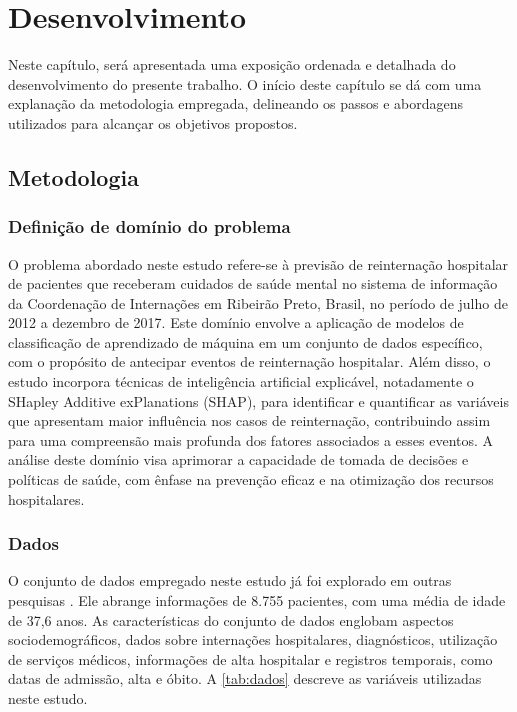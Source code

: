 

\chapter{Desenvolvimento}\label{cap-desenv}

Neste capítulo, será apresentada uma exposição ordenada e detalhada do desenvolvimento do presente trabalho. O início deste capítulo se dá com uma explanação da metodologia empregada, delineando os passos e abordagens utilizados para alcançar os objetivos propostos.

\section{Metodologia}\label{sec-metodologia}

\subsection{Definiç\~ao de domínio do problema}

O problema abordado neste estudo refere-se à previsão de reinternação hospitalar de pacientes que receberam cuidados de saúde mental no sistema de informação da Coordenação de Internações em Ribeirão Preto, Brasil, no período de julho de 2012 a dezembro de 2017. Este domínio envolve a aplicação de modelos de classificação de aprendizado de máquina em um conjunto de dados específico, com o propósito de antecipar eventos de reinternação hospitalar. Além disso, o estudo incorpora técnicas de inteligência artificial explicável, notadamente o SHapley Additive exPlanations (SHAP), para identificar e quantificar as variáveis que apresentam maior influência nos casos de reinternação, contribuindo assim para uma compreensão mais profunda dos fatores associados a esses eventos. A análise deste domínio visa aprimorar a capacidade de tomada de decisões e políticas de saúde, com ênfase na prevenção eficaz e na otimização dos recursos hospitalares.

\subsection{Dados}

O conjunto de dados empregado neste estudo já foi explorado em outras pesquisas \cite{barros2016, eHealth, FeatureSensitivity}. Ele abrange informações de 8.755 pacientes, com uma média de idade de 37,6 anos. As características do conjunto de dados englobam aspectos sociodemográficos, dados sobre internações hospitalares, diagnósticos, utilização de serviços médicos, informações de alta hospitalar e registros temporais, como datas de admissão, alta e óbito. A \autoref{tab:dados} descreve as variáveis utilizadas neste estudo.

